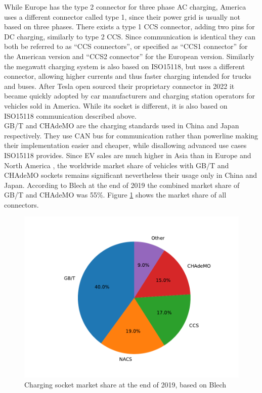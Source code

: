 \documentclass[conference,flushend]{iaria} %
\begin{document}
While Europe has the type 2 connector for three phase AC charging, America uses a different connector called type 1, since their power grid is usually not based on three phases.
There exists a type 1 CCS connector, adding two pins for DC charging, similarly to type 2 CCS.
Since communication is identical they can both be referred to as \enquote{CCS connectors}, or specified as \enquote{CCS1 connector} for the American version and \enquote{CCS2 connector} for the European version.
Similarly the megawatt charging system is also based on ISO15118, but uses a different connector, allowing higher currents and thus faster charging intended for trucks and buses.
After Tesla open sourced their proprietary connector in 2022 \cite{noauthor_opening_nodate} it became quickly adopted by car manufacturers and charging station operators for vehicles sold in America.
While its socket is different, it is also based on ISO15118 communication described above. \\
GB/T and CHAdeMO are the charging standards used in China and Japan respectively.
They use CAN bus for communication rather than powerline making their implementation easier and cheaper, while disallowing advanced use cases ISO15118 provides.
Since EV sales are much higher in Asia than in Europe and North America \cite{noauthor_trends_nodate}, the worldwide market share of vehicles with GB/T and CHAdeMO sockets remains significant nevertheless their usage only in China and Japan.
According to Blech \cite{blech_project_nodate} at the end of 2019 the combined market share of GB/T and CHAdeMO was 55\%. Figure \ref{fig:connector_marketshare} shows the market share of all connectors.

\begin{figure}[ht]
    \centering
    \includegraphics[width=.489\textwidth]{graphs/worldwide_plugs.pdf}
    \caption{Charging socket market share at the end of 2019, based on Blech \cite{blech_project_nodate}}
    \label{fig:connector_marketshare}
\end{figure}
\end{document}
